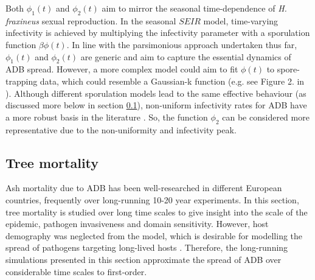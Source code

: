 Both $\phi_1(t)$ and $\phi_2(t)$ aim to mirror the seasonal time-dependence of \textit{H. fraxineus} sexual reproduction.
In the seasonal $SEIR$ model, time-varying infectivity is achieved by multiplying the infectivity parameter with a sporulation function $\beta\phi(t)$.
In line with the parsimonious approach undertaken thus far, $\phi_1(t)$ and $\phi_2(t)$ are generic and aim to capture the essential dynamics of ADB spread.
However, a more complex model could aim to fit $\phi(t)$ to spore-trapping data, which could resemble a Gaussian-k function (e.g. see Figure 2. in \cite{grosdidier2018tracking}).
Although different sporulation models lead to the same effective behaviour (as discussed more below in section \ref{sec:tree-mortality}), 
non-uniform infectivity rates for ADB have a more robust basis in the literature \cite{grosdidier2018tracking, time-varying-infectivity, hietala2013invasive, segarra2001epidemic}.
So, the function $\phi_2$ can be considered more representative due to the non-uniformity and infectivity peak.

\subsection{Tree mortality}
\label{sec:tree-mortality}

Ash mortality due to ADB has been well-researched in different European countries, frequently over long-running 10-20 year experiments.
In this section, tree mortality is studied over long time scales to give insight into the scale of the epidemic, pathogen invasiveness and domain sensitivity.
However, host demography was neglected from the model, which is desirable for modelling the spread of pathogens targeting long-lived hosts \cite{doi:10.1098/rstb.1996.0059}.
Therefore, the long-running simulations presented in this section approximate the spread of ADB over considerable time scales to first-order.

